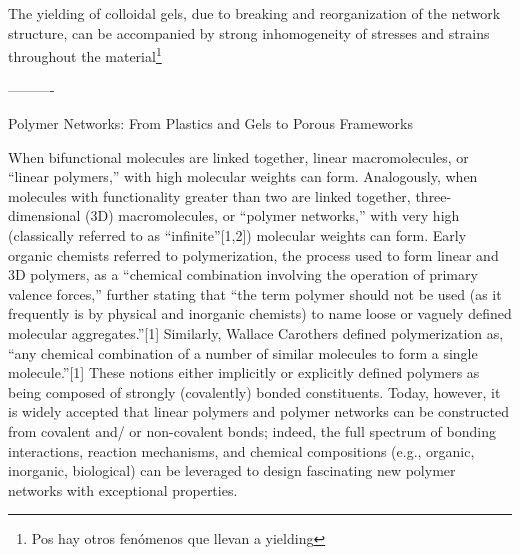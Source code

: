 \documentclass[../../main-notes.tex]{subfiles}
\begin{document}
The yielding of colloidal gels, due to breaking and reorganization of the network structure, can be accompanied by strong inhomogeneity of stresses and strains throughout the material\footnote{Pos hay otros fenómenos que llevan a yielding}

----------

Polymer Networks: From Plastics and Gels to Porous Frameworks\citep{guPolymerNetworksPlastics2020}


When bifunctional molecules are linked together, linear macromolecules, or “linear polymers,” with high molecular weights can form. 
Analogously, when molecules with functionality greater than two are linked together, three-dimensional (3D) macromolecules, or “polymer networks,” with very high (classically referred to as “infinite”[1,2]) molecular weights can form. 
Early organic chemists referred to polymerization, the process used to form linear and 3D polymers, as a “chemical combination involving the operation of primary valence forces,” further stating that “the term polymer should not be used (as it frequently is by physical and inorganic chemists) to name loose or vaguely defined molecular aggregates.”[1] 
Similarly, Wallace Carothers defined polymerization as, “any chemical combination of a number of similar molecules to form a single molecule.”[1] 
These notions either implicitly or explicitly defined polymers as being composed of strongly (covalently) bonded constituents. 
Today, however, it is widely accepted that linear polymers and polymer networks can be constructed from covalent and/ or non-covalent bonds; indeed, the full spectrum of bonding interactions, reaction mechanisms, and chemical compositions (e.g., organic, inorganic, biological) can be leveraged to design fascinating new polymer networks with exceptional properties.
\end{document}
